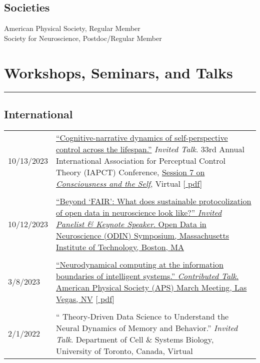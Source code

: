 \documentclass[10pt]{article}
\newcommand{\itemtitle}[1]{{\color{hopkinsblue}\ul{#1}}}
\newcommand{\unpubtitle}[1]{{\color{hopkinsblue} #1}}
\newcommand{\lefttabline}[3]{\hspace{2ex}\makebox[#1][l]{#2} #3\\}
\newcommand{\newsection}[2]{%
  \section*{#1}
  \vspace{-.125in}
  \hrule
  \vspace{.22in}
  \label{sec:#2}
}
\begin{document}
\subsection*{Societies}\label{sec:societies}

\lefttabline{0.8in}{2022--2024}{American Physical Society, Regular Member}
\lefttabline{0.8in}{2011--2022}{Society for Neuroscience, Postdoc/Regular Member}


\smallskip
\newsection{Workshops, Seminars, and Talks}{talks}

\smallskip
\subsection*{International}
\label{sec:talksintl}

\begin{longtable}{@{\hspace{0.1in}}l>{\raggedright\arraybackslash}p{}}
  10/13/2023 & \href{https://jdmonaco.com/files/monaco-IAPCT-2023-slides.pdf}
    {``\itemtitle{Cognitive-narrative dynamics of self-perspective control
    across the lifespan}.''} \emph{Invited Talk}. 33rd Annual International
    Association for Perceptual Control Theory (IAPCT) Conference, 
  \href{https://www.iapct.org/uncategorized/utc-4-boston-time-zone/}
  {Session 7 on \unpubtitle{\emph{Consciousness and the Self}}}, Virtual
  [\href{https://jdmonaco.com/files/monaco-IAPCT-2023-slides.pdf}{\unpubtitle{pdf}}] \\
  \tabularnewline
  10/12/2023 & \href{https://odin.mit.edu/schedule.html}
    {``\itemtitle{Beyond ‘FAIR’: What does sustainable protocolization of
    open data in neuroscience look like?}'' \emph{Invited Panelist \& Keynote
    Speaker}. Open Data in Neuroscience (ODIN) Symposium, Massachusetts Institute
  of Technology, Boston, MA} \\
  \tabularnewline
  3/8/2023 & \href{https://meetings.aps.org/Meeting/MAR23/Session/M01.13}
  {``\itemtitle{Neurodynamical computing at the information boundaries of
    intelligent systems}.'' \emph{Contributed Talk}. American Physical Society (APS)
  March Meeting, Las Vegas, NV}
  [\href{https://jdmonaco.com/files/monaco-APS-March-Meeting-2023-slides.pdf}{\unpubtitle{pdf}}] \\
  \tabularnewline
  2/1/2022 \hspace{0.2in} & ``\unpubtitle{Theory-Driven Data Science to
  Understand the Neural Dynamics of Memory and Behavior}.'' \emph{Invited Talk}.
  Department of Cell \& Systems Biology, University of Toronto, Canada, Virtual \\

\end{longtable}
\end{document}

